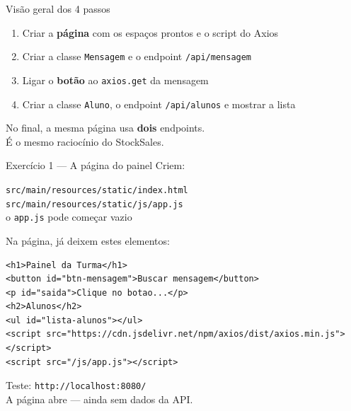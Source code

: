 \documentclass[aspectratio=169,11pt]{beamer}
\begin{document}
\begin{frame}{Visão geral dos 4 passos}
  \begin{enumerate}
    \item Criar a \textbf{página} com os espaços prontos
          e o script do Axios
    \item Criar a classe \texttt{Mensagem} e o endpoint
          \texttt{/api/mensagem}
    \item Ligar o \textbf{botão} ao \texttt{axios.get} da mensagem
    \item Criar a classe \texttt{Aluno}, o endpoint
          \texttt{/api/alunos} e mostrar a lista
  \end{enumerate}

  \vspace{0.7em}
  No final, a mesma página usa \textbf{dois} endpoints.\\
  É o mesmo raciocínio do StockSales.
\end{frame}

\begin{frame}[fragile]{Exercício 1 --- A página do painel}
  Criem:

  \vspace{0.3em}
  \texttt{src/main/resources/static/index.html}\\
  \texttt{src/main/resources/static/js/app.js} \\
  {\small\color{black!60}o \texttt{app.js} pode começar vazio}

  \vspace{0.3em}
  Na página, já deixem estes elementos:
\begin{lstlisting}[basicstyle=\ttfamily\footnotesize]
<h1>Painel da Turma</h1>
<button id="btn-mensagem">Buscar mensagem</button>
<p id="saida">Clique no botao...</p>
<h2>Alunos</h2>
<ul id="lista-alunos"></ul>
<script src="https://cdn.jsdelivr.net/npm/axios/dist/axios.min.js"></script>
<script src="/js/app.js"></script>
\end{lstlisting}

  Teste: \texttt{http://localhost:8080/}\\
  A página abre --- ainda sem dados da API.
\end{frame}
\end{document}
